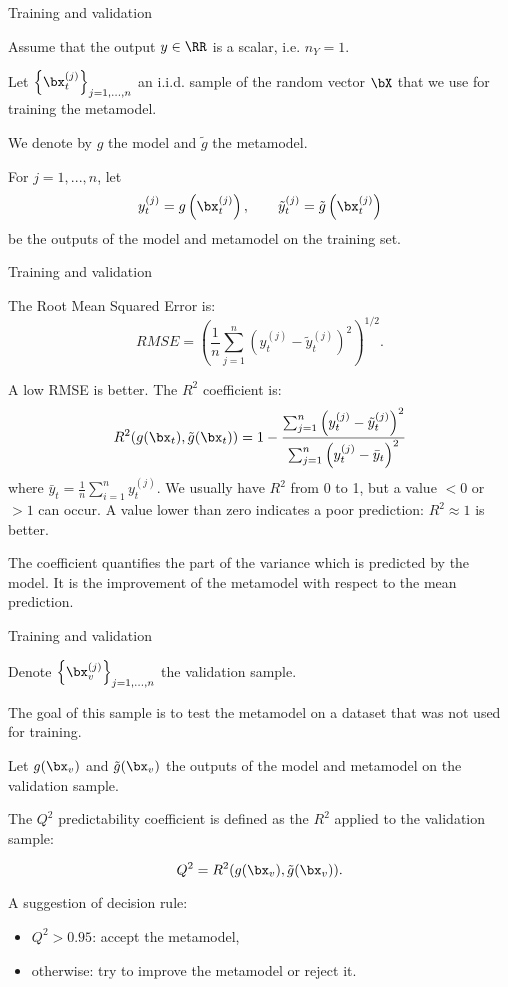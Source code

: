 \documentclass{beamer}
\begin{document}

\begin{frame}[t]{Training and validation}

Assume that the output $y\in\RR$ is a scalar, i.e. $n_Y = 1$. 

Let $\left\{\bx^{(j)}_t\right\}_{j=1,...,n}$ an i.i.d. sample 
of the random vector $\bX$ that we use for training the 
metamodel. 

We denote by $g$ the model and $\tilde{g}$ the metamodel. 

For $j=1,...,n$, let 
$$
y^{(j)}_t = g\left(\bx^{(j)}_t\right), \qquad 
\tilde{y}^{(j)}_t = \tilde{g}\left(\bx^{(j)}_t\right)
$$
 be the outputs of the model and metamodel 
on the training set.
\end{frame}


\begin{frame}[t]{Training and validation}

The Root Mean Squared Error is: 
$$
RMSE
= \left( \frac{1}{n} \sum_{j=1}^n \left( y^{(j)}_t - \tilde{y}^{(j)}_t \right)^2 \right)^{1/2}.
$$

A low RMSE is better. 
The $R^2$ coefficient is: 
$$
R^2(g(\bx_t),\tilde{g}(\bx_t)) 
= 1 - \frac{ \sum_{j=1}^n \left( y^{(j)}_t - \tilde{y}^{(j)}_t \right)^2}
{ \sum_{j=1}^n \left( y^{(j)}_t - \bar{y}_t \right)^2 }
$$
where $\bar{y}_t = \frac{1}{n} \sum_{i=1}^n y^{(j)}_t$. 
We usually have $R^2$ from 0 to 1, but a value $<0$ or $>1$ can occur. 
A value lower than zero indicates a poor prediction: $R^2 \approx 1$ 
is better. 

The coefficient quantifies the part of the variance which is predicted by the 
model. It is the improvement of the metamodel with respect to the 
mean prediction. 

\end{frame}


\begin{frame}[t]{Training and validation}

Denote $\left\{\bx^{(j)}_v\right\}_{j=1,...,n}$ the 
validation sample. 

The goal of this sample is to test the metamodel on a dataset 
that was not used for training.

Let $g(\bx_v)$ and $\tilde{g}(\bx_v)$ the outputs of the 
model and metamodel on the validation sample.

The $Q^2$ predictability coefficient is defined as the $R^2$ 
applied to the validation sample:

$$
Q^2 = R^2(g(\bx_v),\tilde{g}(\bx_v)).
$$

A suggestion of decision rule:
\begin{itemize}
\item $Q^2>0.95$: accept the metamodel,
\item otherwise: try to improve the metamodel or reject it.
\end{itemize}

\end{frame}
\end{document}
